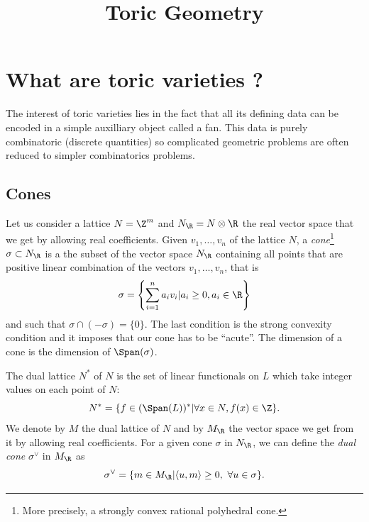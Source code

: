\documentclass{worksheetclass}
\title{Toric Geometry}
\begin{document}
\maketitle

\tableofcontents

\section{What are toric varieties ?}

    The interest of toric varieties lies in the fact that all its defining data can be encoded in a simple auxilliary object called a fan. This data is purely combinatoric (discrete quantities) so complicated geometric problems are often reduced to simpler combinatorics problems.

    \subsection{Cones}

        Let us consider a lattice $N=\Z^m$ and $N_\R=N\otimes\R$ the real vector space that we get by allowing real coefficients. Given $v_1,\dots,v_n$ of the lattice $N$, a \emph{cone}\footnote{More precisely, a strongly convex rational polyhedral cone.} $\sigma\subset N_\R$ is a the subset of the vector space $N_\R$ containing all points that are positive linear combination of the vectors $v_1,\dots,v_n$, that is
        \begin{equation}
            \sigma=\left\{\sum^n_{i=1}a_iv_i|a_i\geq0,a_i\in\R\right\}
        \end{equation}
        and such that $\sigma\cap(-\sigma)=\{0\}$. The last condition is the strong convexity condition and it imposes that our cone has to be ``acute''. The dimension of a cone is the dimension of $\Span(\sigma)$.
        
        The dual lattice $N^*$ of $N$ is the set of linear functionals on $L$ which take integer values on each point of $N$:
        \begin{equation}
            N^*=\{f\in(\Span(L))^*|\forall x\in N,f(x)\in\Z\}.
        \end{equation}
        We denote by $M$ the dual lattice of $N$ and by $M_\R$ the vector space we get from it by allowing real coefficients. For a given cone $\sigma$ in $ N_\R$, we can define the \emph{dual cone} $\sigma^\vee$ in $M_\R$ as
        \begin{equation}
            \sigma^\vee=\{m\in M_\R|\langle u,m\rangle\geq0,~ \forall u\in\sigma\}.
        \end{equation}
\end{document}
